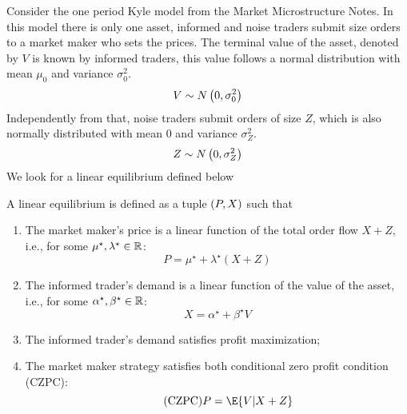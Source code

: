 \begin{solution}
    Consider the one period Kyle model from the Market Microstructure Notes. In this model there is only one asset, informed and noise traders submit size orders to a market maker who sets the prices. The terminal value of the asset, denoted by \(V\) is known by informed traders, this value follows a normal distribution with mean \(\mu_0\) and variance \(\sigma_0^2\). 
    \[
        V \sim N\left( 0, \sigma_0^2 \right)
    \]
    Independently from that, noise traders submit orders of size \(Z\), which is also normally distributed with mean 0 and variance \(\sigma_Z^2\).
    \[
        Z \sim N\left( 0, \sigma_Z^2 \right)
    \]
    We look for a linear equilibrium defined below

    \begin{definition*}
    A linear equilibrium is defined as a tuple \(\left( P, X \right)\) such that
    \begin{enumerate}
        \item The market maker's price is a linear function of the total order flow \(X + Z\), i.e., for some \(\mu^\star, \lambda^\star \in \mathbb{R}\):
        \[
            P = \mu^\star + \lambda^\star (X + Z)
        \]
        \item The informed trader's demand is a linear function of the value of the asset, i.e., for some \(\alpha^\star, \beta^\star \in \mathbb{R}\):
        \[
            X = \alpha^\star + \beta^\star V
        \]
        \item The informed trader's demand satisfies profit maximization;
        \item The market maker strategy satisfies both conditional zero profit condition (CZPC):
        \begin{equation}
            \label{eq:czpc}
            \tag{CZPC}
            P = \E{V \vert X+Z}
        \end{equation}
    \end{enumerate}
    \end{definition*}


\end{solution}
